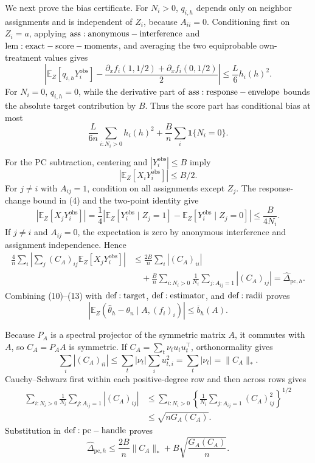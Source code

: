 We next prove the bias certificate.  For \(N_i>0\), \(q_{i,h}\) depends only on neighbor assignments and is independent of \(Z_i\), because \(A_{ii}=0\).  Conditioning first on \(Z_i=a\), applying \({\rm ass:anonymous-interference}\) and \({\rm lem:exact-score-moments}\), and averaging the two equiprobable own-treatment values gives
\[
 \left|\mathbb E_Z[q_{i,h}Y_i^{\mathrm{obs}}]
 -\frac{\partial_xf_i(1,1/2)+\partial_xf_i(0,1/2)}2\right|
 \leq\frac L6h_i(h)^2.
\tag{9}
\]
For \(N_i=0\), \(q_{i,h}=0\), while the derivative part of \({\rm ass:response-envelope}\) bounds the absolute target contribution by \(B\).  Thus the score part has conditional bias at most
\[
 \frac{L}{6n}\sum_{i:N_i>0}h_i(h)^2
 +\frac Bn\sum_i\mathbf1\{N_i=0\}.
\tag{10}
\]

For the PC subtraction, centering and \(|Y_i^{\mathrm{obs}}|\leq B\) imply
\[
 |\mathbb E_Z[X_iY_i^{\mathrm{obs}}]|\leq B/2.
\tag{11}
\]
For \(j\ne i\) with \(A_{ij}=1\), condition on all assignments except \(Z_j\).  The response-change bound in (4) and the two-point identity give
\[
 |\mathbb E_Z[X_jY_i^{\mathrm{obs}}]|
 =\frac14\left|\mathbb E_Z[Y_i^{\mathrm{obs}}\mid Z_j=1]
 -\mathbb E_Z[Y_i^{\mathrm{obs}}\mid Z_j=0]\right|
 \leq\frac B{4N_i}.
\tag{12}
\]
If \(j\ne i\) and \(A_{ij}=0\), the expectation is zero by anonymous interference and assignment independence.  Hence
\[
\begin{aligned}
 \frac4n\sum_i\left|\sum_j(C_A)_{ij}\mathbb E_Z[X_jY_i^{\mathrm{obs}}]\right|
 &\leq\frac{2B}{n}\sum_i|(C_A)_{ii}|\\
 &\quad+\frac Bn\sum_{i:N_i>0}\frac1{N_i}\sum_{j:A_{ij}=1}|(C_A)_{ij}|
 =\widehat\Delta_{\mathrm{pc},h}.
\end{aligned}
\tag{13}
\]
Combining (10)--(13) with \({\rm def:target}\), \({\rm def:estimator}\), and \({\rm def:radii}\) proves
\[
 \left|\mathbb E_Z(\widehat\theta_h-\theta_n\mid A,(f_i)_i)\right|
 \leq\overline b_h(A).
\tag{14}
\]

Because \(P_A\) is a spectral projector of the symmetric matrix \(A\), it commutes with \(A\), so \(C_A=P_AA\) is symmetric.  If \(C_A=\sum_t\nu_tu_tu_t^\top\), orthonormality gives
\[
 \sum_i|(C_A)_{ii}|
 \leq\sum_t|\nu_t|\sum_i u_{t,i}^2=\sum_t|\nu_t|=\|C_A\|_*.
\tag{15}
\]
Cauchy--Schwarz first within each positive-degree row and then across rows gives
\[
\begin{aligned}
 \sum_{i:N_i>0}\frac1{N_i}\sum_{j:A_{ij}=1}|(C_A)_{ij}|
 &\leq\sum_{i:N_i>0}
 \left\{\frac1{N_i}\sum_{j:A_{ij}=1}(C_A)_{ij}^2\right\}^{1/2}\\
 &\leq\sqrt{nG_A(C_A)}.
\end{aligned}
\tag{16}
\]
Substitution in \({\rm def:pc-handle}\) proves
\[
 \widehat\Delta_{\mathrm{pc},h}
 \leq\frac{2B}{n}\|C_A\|_*+B\sqrt{\frac{G_A(C_A)}n}.
\tag{17}
\]


